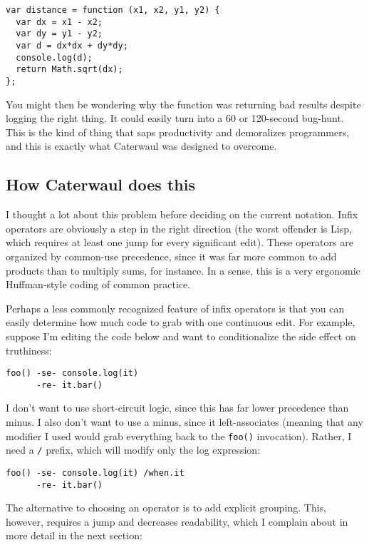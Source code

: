 \documentclass{report}
\begin{document}
\begin{verbatim}
var distance = function (x1, x2, y1, y2) {
  var dx = x1 - x2;
  var dy = y1 - y2;
  var d = dx*dx + dy*dy;
  console.log(d);
  return Math.sqrt(dx);
};
\end{verbatim}

    You might then be wondering why the function was returning bad results despite logging the right thing. It could easily turn into a 60 or 120-second bug-hunt. This is the kind of thing
    that saps productivity and demoralizes programmers, and this is exactly what Caterwaul was designed to overcome.

\subsection{How Caterwaul does this}
      I thought a lot about this problem before deciding on the current notation. Infix operators are obviously a step in the right direction (the worst offender is Lisp, which requires at
      least one jump for every significant edit). These operators are organized by common-use precedence, since it was far more common to add products than to multiply sums, for instance. In a
      sense, this is a very ergonomic Huffman-style coding of common practice.

      Perhaps a less commonly recognized feature of infix operators is that you can easily determine how much code to grab with one continuous edit. For example, suppose I'm editing the code
      below and want to conditionalize the side effect on truthiness:

\begin{verbatim}
foo() -se- console.log(it)
      -re- it.bar()
\end{verbatim}

      I don't want to use short-circuit logic, since this has far lower precedence than minus. I also don't want to use a minus, since it left-associates (meaning that any modifier I used
      would grab everything back to the {\tt foo()} invocation). Rather, I need a {\tt /} prefix, which will modify only the log expression:

\begin{verbatim}
foo() -se- console.log(it) /when.it
      -re- it.bar()
\end{verbatim}

      The alternative to choosing an operator is to add explicit grouping. This, however, requires a jump and decreases readability, which I complain about in more detail in the next section:
\end{document}
